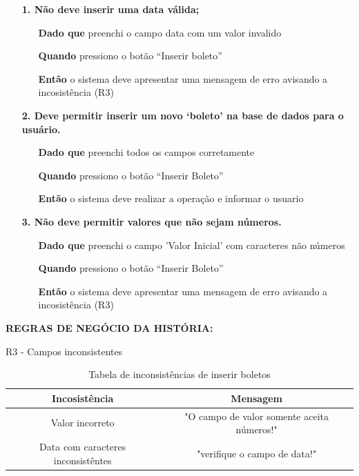 \begin{itemize}
    \item[] \textbf{1. Não deve inserir uma data válida;}

    \begin{itemize}
        \item[\textbf{Dado que}] preenchi o campo data com um valor invalido
        \item[\textbf{Quando}] pressiono o botão ``Inserir boleto''
        \item[\textbf{Então}] o sistema deve apresentar uma mensagem de erro avisando a incosistência (R3)
    \end{itemize}

    \item[] \textbf{2. Deve permitir inserir um novo ‘boleto’ na base de dados para o
usuário.}

    \begin{itemize}
        \item[\textbf{Dado que}] preenchi todos os campos corretamente
        \item[\textbf{Quando}] pressiono o botão ``Inserir Boleto''
        \item[\textbf{Então}] o sistema deve realizar a operação e informar o usuario
    \end{itemize}

    \item[] \textbf{3. Não deve permitir valores que não sejam números.}

    \begin{itemize}
        \item[\textbf{Dado que}] preenchi o campo 'Valor Inicial' com caracteres não números
        \item[\textbf{Quando}] pressiono o botão ``Inserir Boleto''
        \item[\textbf{Então}]  o sistema deve apresentar uma mensagem de erro avisando a incosistência (R3)
    \end{itemize}

    
\end{itemize}

\textbf{REGRAS DE NEGÓCIO DA HISTÓRIA:}

    R3 - Campos inconsistentes

    \begin{table}[htb]
        \caption{Tabela de inconsistências de inserir boletos}
        \centering
        \begin{tabular}{|c|c|}
        \hline
          \textbf{Incosistência}   &  \textbf{Mensagem} \\
        \hline
        Valor incorreto   & "O campo de valor somente aceita números!" \\
        \hline
        Data com caracteres inconsistêntes   & "verifique o campo de data!"  \\
        \hline
        \end{tabular}
        \label{tab:tabela_login}
    \end{table}

